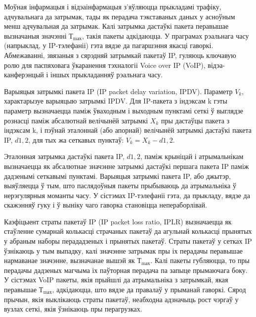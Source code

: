 Моўная інфармацыя і відэаінфармацыя з'яўляюцца прыкладамі трафіку, адчувальнага да затрымак, тады як перадача тэкставаных даных у асноўным менш адчувальная да затрымак. Калі затрымка дастаўкі пакета перавышае вызначаныя значэнні $Т_\text{mах}$, такія пакеты адкідаюцца. У праграмах рэальнага часу (напрыклад, у IP-тэлефаніі) гэта вядзе да пагаршэння якасці гаворкі. Абмежаванні, звязаныя з сярэдняй затрымкай пакетаў IP, гуляюць ключавую ролю для паспяховага ўкаранення тэхналогіі Voice over IP (VoIP), відэа-канферэнцый і іншых прыкладанняў рэальнага часу.

Варыяцыя затрымкі пакета IP (IP packet delay variation, IPDV). Параметр $V_k$, характарызуе варыяцыю затрымкі IPDV. Для IP-пакета з індэксам k гэты параметр вызначаецца паміж ўваходным і выходным пунктамі сеткі ў выглядзе рознасці паміж абсалютнай велічынёй затрымкі $X_k$ пры дастаўцы пакета з індэксам k, і пэўнай эталоннай (або апорнай) велічынёй затрымкі дастаўкі пакета IP, $d1{,}2$, для тых жа сеткавых пунктаў: $V_k = X_k - d1{,}2$.

Эталонная затрымка дастаўкі пакета IP, $d1{,}2$, паміж крыніцай і атрымальнікам вызначаецца як абсалютнае значэнне затрымкі дастаўкі першага пакета IP паміж дадзенымі сеткавымі пунктамі. Варыяцыя затрымкі пакета IP, або джытэр, выяўляецца ў тым, што паслядоўныя пакеты прыбываюць да атрымальніка ў нерэгулярныя моманты часу. У сістэмах IP-тэлефаніі гэта, да прыкладу, вядзе да скажэнняў гуку і ў выніку чаго гаворка становіцца непераборлівай.

Каэфіцыент страты пакетаў IP (IP packet loss ratio, IPLR) вызначаецца як стаўленне сумарнай колькасці страчаных пакетаў да агульнай колькасці прынятых у абраным наборы перададзеных і прынятых пакетаў. Страты пакетаў у сетках IP ўзнікаюць у тым выпадку, калі значэнне затрымак пры іх перадачы перавышае нармаванае значэнне, вызначанае вышэй як $Т_\text{mах}$. Калі пакеты губляюцца, то пры перадачы дадзеных магчыма іх паўторная перадача па запыце прымаючага боку. У сістэмах VoIP пакеты, якія прыйшлі да атрымальніка з затрымкай, якая перавышае $Т_\text{mах}$, адкідаюцца, што вядзе да правалаў у прыманай гаворкі. Сярод прычын, якія выклікаюць страты пакетаў, неабходна адзначыць рост чэргаў у вузлах сеткі, якія ўзнікаюць пры перагрузках.


